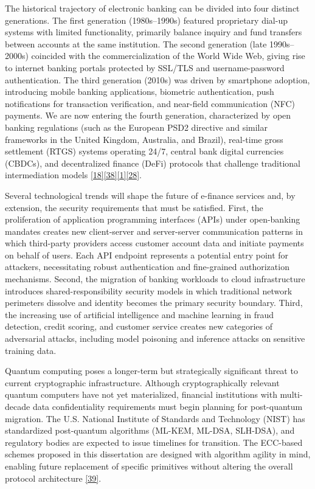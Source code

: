 \indent The historical trajectory of electronic banking can be divided into four distinct generations. The first generation (1980s--1990s) featured proprietary dial-up systems with limited functionality, primarily balance inquiry and fund transfers between accounts at the same institution. The second generation (late 1990s--2000s) coincided with the commercialization of the World Wide Web, giving rise to internet banking portals protected by SSL/TLS and username-password authentication. The third generation (2010s) was driven by smartphone adoption, introducing mobile banking applications, biometric authentication, push notifications for transaction verification, and near-field communication (NFC) payments. We are now entering the fourth generation, characterized by open banking regulations (such as the European PSD2 directive and similar frameworks in the United Kingdom, Australia, and Brazil), real-time gross settlement (RTGS) systems operating 24/7, central bank digital currencies (CBDCs), and decentralized finance (DeFi) protocols that challenge traditional intermediation models \hyperref[ref:18]{[18]}\hyperref[ref:38]{[38]}\hyperref[ref:1]{[1]}\hyperref[ref:28]{[28]}.

\indent Several technological trends will shape the future of e-finance services and, by extension, the security requirements that must be satisfied. First, the proliferation of application programming interfaces (APIs) under open-banking mandates creates new client-server and server-server communication patterns in which third-party providers access customer account data and initiate payments on behalf of users. Each API endpoint represents a potential entry point for attackers, necessitating robust authentication and fine-grained authorization mechanisms. Second, the migration of banking workloads to cloud infrastructure introduces shared-responsibility security models in which traditional network perimeters dissolve and identity becomes the primary security boundary. Third, the increasing use of artificial intelligence and machine learning in fraud detection, credit scoring, and customer service creates new categories of adversarial attacks, including model poisoning and inference attacks on sensitive training data.

\indent Quantum computing poses a longer-term but strategically significant threat to current cryptographic infrastructure. Although cryptographically relevant quantum computers have not yet materialized, financial institutions with multi-decade data confidentiality requirements must begin planning for post-quantum migration. The U.S. National Institute of Standards and Technology (NIST) has standardized post-quantum algorithms (ML-KEM, ML-DSA, SLH-DSA), and regulatory bodies are expected to issue timelines for transition. The ECC-based schemes proposed in this dissertation are designed with algorithm agility in mind, enabling future replacement of specific primitives without altering the overall protocol architecture \hyperref[ref:39]{[39]}.

